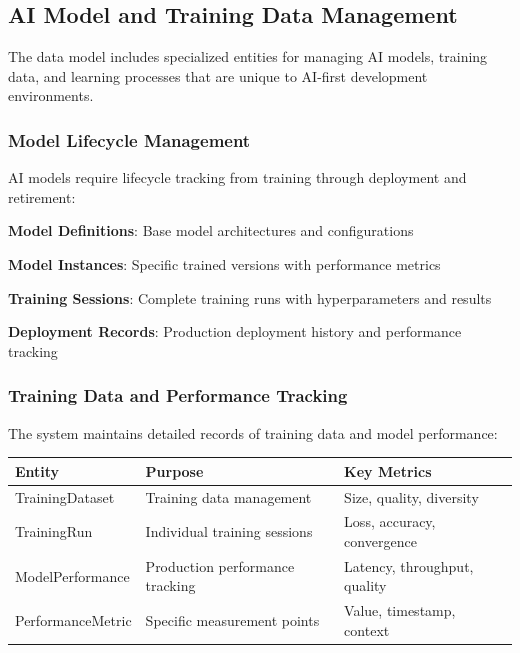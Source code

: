 \subsection*{AI Model and Training Data Management}

The data model includes specialized entities for managing AI models, training data, and learning processes that are unique to AI-first development environments.

\subsubsection*{Model Lifecycle Management}

AI models require lifecycle tracking from training through deployment and retirement:

\begin{expandedlist}
    \item \textbf{Model Definitions}: Base model architectures and configurations
    \item \textbf{Model Instances}: Specific trained versions with performance metrics
    \item \textbf{Training Sessions}: Complete training runs with hyperparameters and results
    \item \textbf{Deployment Records}: Production deployment history and performance tracking
\end{expandedlist}

\subsubsection*{Training Data and Performance Tracking}

The system maintains detailed records of training data and model performance:

\begin{center}
\begin{tabular}{@{}lll@{}}
\toprule
\textbf{Entity} & \textbf{Purpose} & \textbf{Key Metrics} \\
\midrule
TrainingDataset & Training data management & Size, quality, diversity \\
TrainingRun & Individual training sessions & Loss, accuracy, convergence \\
ModelPerformance & Production performance tracking & Latency, throughput, quality \\
PerformanceMetric & Specific measurement points & Value, timestamp, context \\
\bottomrule
\end{tabular}
\end{center}

